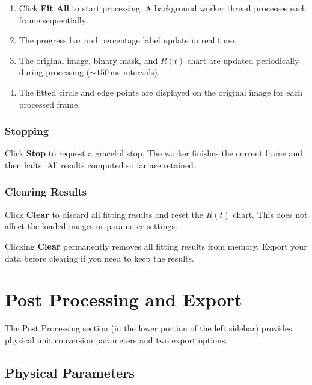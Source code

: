 \documentclass[11pt, letterpaper]{article}
\begin{document}
\begin{enumerate}
    \item Click \textbf{Fit All} to start processing. A background worker
          thread processes each frame sequentially.
    \item The progress bar and percentage label update in real time.
    \item The original image, binary mask, and $R(t)$ chart are updated
          periodically during processing (${\sim}150$\,ms intervals).
    \item The fitted circle and edge points are displayed on the original
          image for each processed frame.
\end{enumerate}

\subsubsection{Stopping}

Click \textbf{Stop} to request a graceful stop. The worker finishes the
current frame and then halts. All results computed so far are retained.

\subsubsection{Clearing Results}

Click \textbf{Clear} to discard all fitting results and reset the $R(t)$
chart. This does not affect the loaded images or parameter settings.

\begin{warnbox}[Warning]
    Clicking \textbf{Clear} permanently removes all fitting results from
    memory. Export your data before clearing if you need to keep the results.
\end{warnbox}


\section{Post Processing and Export}

The Post Processing section (in the lower portion of the left sidebar)
provides physical unit conversion parameters and two export options.

\subsection{Physical Parameters}
\end{document}
